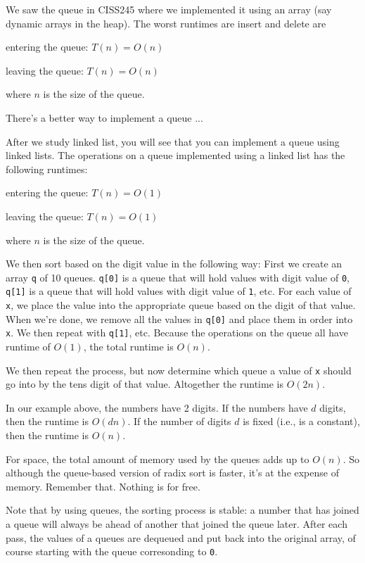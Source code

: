 

We saw the queue in CISS245 where we implemented it using an array
(say dynamic arrays in the heap).
The worst runtimes are insert and delete are
\begin{tightlist}
\item entering the queue: $T(n) = O(n)$  
\item leaving the queue: $T(n) = O(n)$ 
\end{tightlist}
where $n$ is the size of the queue.

There's a better way to implement a queue ...

After we study linked list, you will see that you can implement a queue using
linked lists.
The operations 
on a queue implemented using a linked list has the following runtimes:
\begin{tightlist}
\item entering the queue: $T(n) = O(1)$ 
\item leaving the queue: $T(n) = O(1)$ 
\end{tightlist}
where $n$ is the size of the queue.

We then sort based on the digit value in the following way:
First we create an array \verb!q! of 10 queues.
\verb!q[0]! is a queue that will hold values with digit value of \verb!0!,
\verb!q[1]! is a queue that will hold values with digit value of \verb!1!, etc.
For each value of \verb!x!, we place the value into the appropriate queue
based on the digit of that value.
When we're done, we remove all the values in \verb!q[0]! and place them
in order into \verb!x!.
We then repeat with \verb!q[1]!, etc.
Because the operations on the queue all have runtime of $O(1)$,
the total runtime is $O(n)$.

We then repeat the process, but now determine which queue a value of \verb!x!
should go into by the tens digit of that value.
Altogether the runtime is $O(2n)$.

In our example above, the numbers have 2 digits.
If the numbers have $d$ digits, then the runtime is $O(dn)$.
If the number of digits $d$ is fixed (i.e., is a constant),
then the runtime is $O(n)$.

For space, the total amount of memory used by the queues 
adds up to 
$O(n)$.
So although the queue-based version of radix sort is faster,
it's at the expense of memory.
Remember that.
Nothing is for free.

Note that by using queues, 
the sorting process is stable:
a number that has joined a queue will always be ahead of another
that joined the queue later.
After each pass, the values of a queues are dequeued and put back 
into the original array, of course starting with 
the queue corresonding to \verb!0!.

